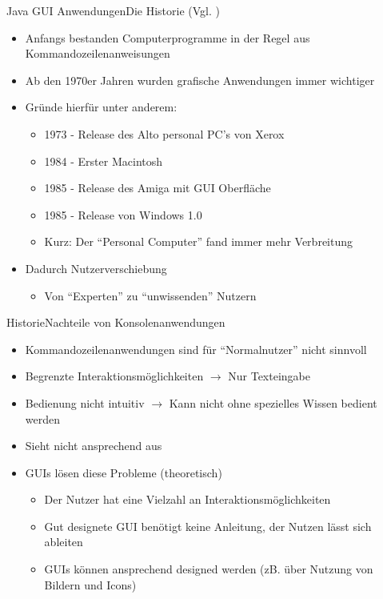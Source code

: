 \begin{frame}{Java GUI Anwendungen}{Die Historie (Vgl. \cite{wiki:guihist})}
    \begin{itemize}
        \item Anfangs bestanden Computerprogramme in der Regel aus Kommandozeilenanweisungen
        \item Ab den 1970er Jahren wurden grafische Anwendungen immer wichtiger
		\item Gründe hierfür unter anderem:
		\begin{itemize}
			\item 1973 - Release des Alto personal PC's von Xerox
			\item 1984 - Erster Macintosh
			\item 1985 - Release des Amiga mit GUI Oberfläche
			\item 1985 - Release von Windows 1.0
			\item Kurz: Der "`Personal Computer"' fand immer mehr Verbreitung
		\end{itemize}
		\item Dadurch Nutzerverschiebung
        \begin{itemize}
		\item Von "`Experten"' zu "`unwissenden"' Nutzern
		\end{itemize}
    \end{itemize}
\end{frame}

\begin{frame}{Historie}{Nachteile von Konsolenanwendungen}
	\begin{itemize}
		\item Kommandozeilenanwendungen sind für "`Normalnutzer"' nicht sinnvoll
		\item Begrenzte Interaktionsmöglichkeiten $\rightarrow$ Nur Texteingabe
		\item Bedienung nicht intuitiv $\rightarrow$ Kann nicht ohne spezielles Wissen bedient werden
		\item Sieht nicht ansprechend aus
		\item GUIs lösen diese Probleme (theoretisch)
		\begin{itemize}
			\item Der Nutzer hat eine Vielzahl an Interaktionsmöglichkeiten
			\item Gut designete GUI benötigt keine Anleitung, der Nutzen lässt sich ableiten
			\item GUIs können ansprechend designed werden (zB. über Nutzung von Bildern und Icons)
		\end{itemize}
	\end{itemize}
\end{frame}

